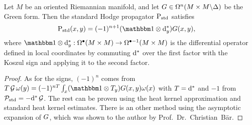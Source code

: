 \documentclass[\MainFolder/Text.tex]{subfiles}
\begin{document}
\begin{Proposition}\label{Prop:StdCodifInt}
Let $M$ be an oriented Riemannian manifold, and let $G\in \Omega^n(M\times M\backslash\Delta)$ be the Green form. Then the standard Hodge propagator $\mathrm{P}_{\mathrm{std}}$ satisfies
\begin{equation}\label{Eq:FormForPUsingG}
\StdPrpg(x,y)= (-1)^{n+1}(\Id\otimes \CoDd_y)\GKer(x,y),
\end{equation}
where $\Id\otimes \CoDd_y: \DR^\bullet(M\times M) \rightarrow \DR^{\bullet-1}(M \times M)$ is the differential operator defined in local coordinates by commuting $\mathrm{d}^*$ over the first factor with the Koszul sign and applying it to the second factor.
\end{Proposition}
\begin{proof}
As for the signs, $(-1)^n$ comes from $\TOp \GOp \omega(y) = (-1)^{nT}\int_x(\Id \otimes \TOp_y)\GKer(x,y)\omega(x)$ with $T=\mathrm{d}^*$ and $-1$ from $\mathcal{P}_{\mathrm{std}} = - \mathrm{d}^*\operatorname{\mathcal{G}}$.
The rest can be proven using the heat kernel approximation and standard heat kernel estimates.
There is an other method using the asymptotic expansion of $G$, which was shown to the author by Prof.~Dr.~Christian~Bär.
\end{proof}
%
%

%
%

%
\end{document}

